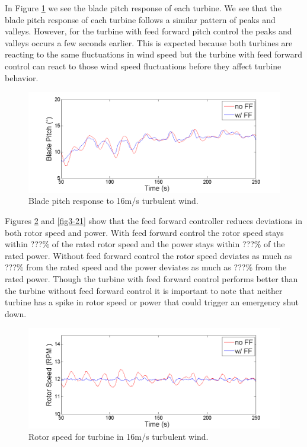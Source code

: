 In Figure \ref{fig3-19} we see the blade pitch response of each turbine. We see that the blade pitch response of each turbine follows a similar pattern of peaks and valleys. However, for the turbine with feed forward pitch control the peaks and valleys occurs a few seconds earlier. This is expected because both turbines are reacting to the same fluctuations in wind speed but the turbine with feed forward control can react to those wind speed fluctuations before they affect turbine behavior. 

\begin{figure}[htbp]
	\centering
		\includegraphics[trim = {1cm 0 2cm 0}, clip, width = \linewidth]{Figures/ch3Figures/fig3-19.png}
		
	\caption{Blade pitch response to 16m/s turbulent wind.}
	\label{fig3-19}
\end{figure}

Figures \ref{fig3-20} and \ref{fig3-21} show that the feed forward controller  reduces deviations in both rotor speed and power. With feed forward control the rotor speed stays within ???$\%$ of the rated rotor speed and the power stays within ???$\%$ of the rated power. Without feed forward control the rotor speed deviates as much as ???$\%$ from the rated speed and the power deviates as much as ???$\%$ from the rated power. Though the turbine with feed forward control performs better than the turbine without feed forward control it is important to note that neither turbine has a spike in rotor speed or power that could trigger an emergency shut down.

\begin{figure}[htbp]
	\centering
		\includegraphics[trim = {1cm 0 2cm 0}, clip, width = \linewidth]{Figures/ch3Figures/fig3-20.png}
		
	\caption{Rotor speed for turbine in 16m/s turbulent wind.}
	\label{fig3-20}
\end{figure}

